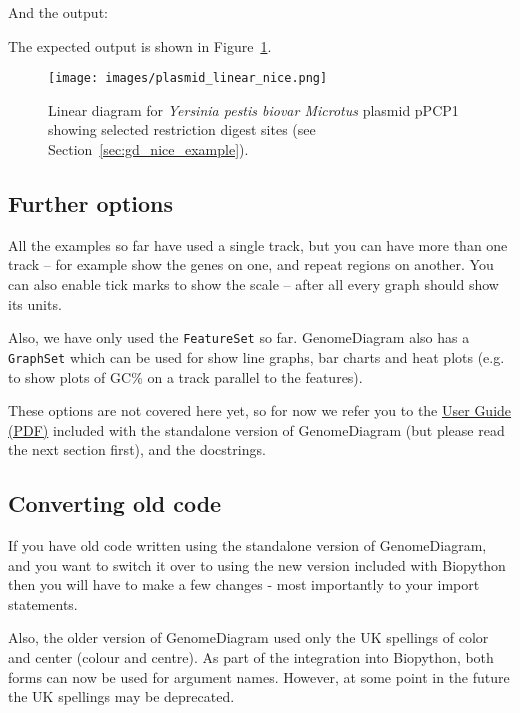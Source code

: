 \documentclass{report}
\begin{document}
\begin{htmlonly}
\noindent And the output:


\end{htmlonly}
\begin{latexonly}
\noindent The expected output is shown in Figure~\ref{fig:plasmid_linear_nice}.
\begin{figure}[htbp]
\centering
\texttt{[image: images/plasmid\_linear\_nice.png]}
\caption{Linear diagram for \textit{Yersinia pestis biovar Microtus} plasmid
pPCP1 showing selected restriction digest sites (see
Section~\ref{sec:gd_nice_example}).}
\label{fig:plasmid_linear_nice}
\end{figure}
\end{latexonly}

\subsection{Further options}

All the examples so far have used a single track, but you can have more than
one track -- for example show the genes on one, and repeat regions on another.
You can also enable tick marks to show the scale -- after all every graph
should show its units.

Also, we have only used the \verb|FeatureSet| so far. GenomeDiagram also has
a \verb|GraphSet| which can be used for show line graphs, bar charts and heat
plots (e.g. to show plots of GC\% on a track parallel to the features).

These options are not covered here yet, so for now we refer you to the
\href{http://bioinf.scri.ac.uk/lp/downloads/programs/genomediagram/userguide.pdf}
{User Guide (PDF)} included with the standalone version of GenomeDiagram (but
please read the next section first), and the docstrings.

\subsection{Converting old code}

If you have old code written using the standalone version of GenomeDiagram, and
you want to switch it over to using the new version included with Biopython then
you will have to make a few changes - most importantly to your import statements.

Also, the older version of GenomeDiagram used only the UK spellings of color and
center (colour and centre).  As part of the integration into Biopython, both
forms can now be used for argument names. However, at some point in the future the
UK spellings may be deprecated.
\end{document}
